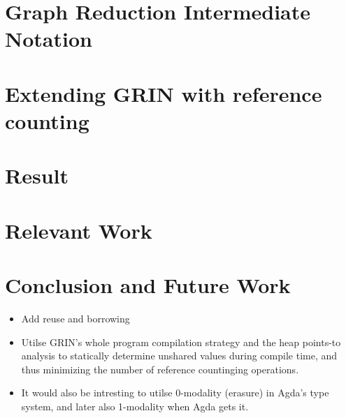 \documentclass{article}
\begin{document}









\section{Graph Reduction Intermediate Notation}

\section{Extending GRIN with reference counting}

\section{Result}

\section{Relevant Work}

\section{Conclusion and Future Work}
\begin{itemize}
\item Add reuse and borrowing
\item Utilse GRIN's whole program compilation strategy and the heap points-to analysis to statically determine unshared values during compile time, and thus minimizing the number of reference countinging operations.
\item It would also be intresting to utilse 0-modality (erasure) in Agda's type system, and later also 1-modality when Agda gets it.
\end{itemize}


\printbibliography
\end{document}
